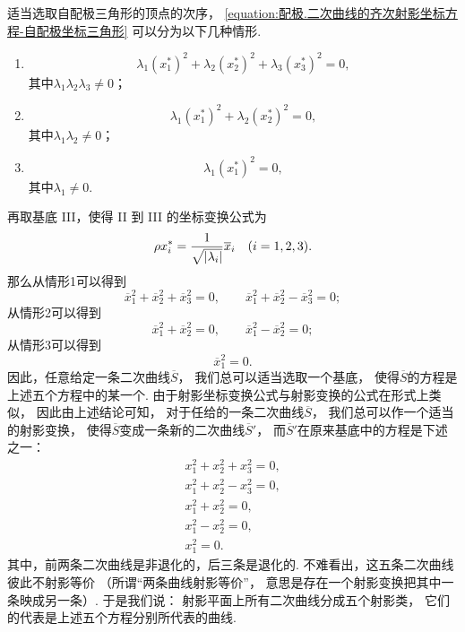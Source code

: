 适当选取自配极三角形的顶点的次序，
\cref{equation:配极.二次曲线的齐次射影坐标方程-自配极坐标三角形}
可以分为以下几种情形.
\begingroup
{}
\begin{enumerate}[label={{\rm\bf 情形}\arabic*.}]
	\item \begin{equation*}
		\lambda_1 (x^*_1)^2
		+ \lambda_2 (x^*_2)^2
		+ \lambda_3 (x^*_3)^2
		= 0,
	\end{equation*}
	其中\(\lambda_1 \lambda_2 \lambda_3 \neq 0\)；

	\item \begin{equation*}
		\lambda_1 (x^*_1)^2
		+ \lambda_2 (x^*_2)^2
		= 0,
	\end{equation*}
	其中\(\lambda_1 \lambda_2 \neq 0\)；

	\item \begin{equation*}
		\lambda_1 (x^*_1)^2
		= 0,
	\end{equation*}
	其中\(\lambda_1 \neq 0\).
\end{enumerate}
\endgroup
再取基底 III，使得 II 到 III 的坐标变换公式为\begin{equation*}
	\rho x^*_i
	= \frac1{\sqrt{\abs{\lambda_i}}}
	\overline{x}_i
	\quad(i=1,2,3).
\end{equation*}
那么从情形1可以得到\begin{equation*}
	\overline{x}_1^2
	+ \overline{x}_2^2
	+ \overline{x}_3^2
	= 0,
	\qquad
	\overline{x}_1^2
	+ \overline{x}_2^2
	- \overline{x}_3^2
	= 0;
\end{equation*}
从情形2可以得到\begin{equation*}
	\overline{x}_1^2
	+ \overline{x}_2^2
	= 0,
	\qquad
	\overline{x}_1^2
	- \overline{x}_2^2
	= 0;
\end{equation*}
从情形3可以得到\begin{equation*}
	\overline{x}_1^2
	= 0.
\end{equation*}
因此，任意给定一条二次曲线\(\overline{S}\)，
我们总可以适当选取一个基底，
使得\(\overline{S}\)的方程是上述五个方程中的某一个.
由于射影坐标变换公式与射影变换的公式在形式上类似，
因此由上述结论可知，
对于任给的一条二次曲线\(\overline{S}\)，
我们总可以作一个适当的射影变换，
使得\(\overline{S}\)变成一条新的二次曲线\(\overline{S}'\)，
而\(\overline{S}'\)在原来基底中的方程是下述之一：\begin{gather*}
	x_1^2 + x_2^2 + x_3^2 = 0, \\
	x_1^2 + x_2^2 - x_3^2 = 0, \\
	x_1^2 + x_2^2 = 0, \\
	x_1^2 - x_2^2 = 0, \\
	x_1^2 = 0.
\end{gather*}
其中，前两条二次曲线是非退化的，后三条是退化的.
不难看出，这五条二次曲线彼此不射影等价
（所谓“两条曲线射影等价”，
意思是存在一个射影变换把其中一条映成另一条）.
于是我们说：
射影平面上所有二次曲线分成五个射影类，
它们的代表是上述五个方程分别所代表的曲线.

